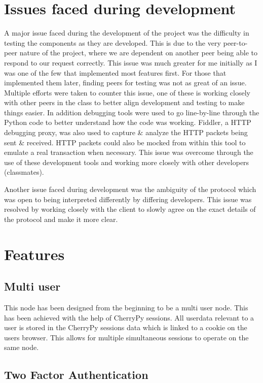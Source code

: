 \documentclass[a4paper,10pt,twoside]{article}
\begin{document}
\section{Issues faced during development}

A major issue faced during the development of the project was the difficulty in testing the components as they are developed. This is due to the very peer-to-peer nature of the project, where we are dependent on another peer being able to respond to our request correctly. This issue was much greater for me initially as I was one of the few that implemented most features first. For those that implemented them later, finding peers for testing was not as great of an issue. Multiple efforts were taken to counter this issue, one of these is working closely with other peers in the class to better align development and testing to make things easier. In addition debugging tools were used to go line-by-line through the Python code to better understand how the code was working. Fiddler, a HTTP debugging proxy, was also used to capture \& analyze the HTTP packets being sent \& received. HTTP packets could also be mocked from within this tool to emulate a real transaction when necessary. This issue was overcome through the use of these development tools and working more closely with other developers (classmates).

Another issue faced during development was the ambiguity of the protocol which was open to being interpreted differently by differing developers. This issue was resolved by working closely with the client to slowly agree on the exact details of the protocol and make it more clear. 

\section{Features}

\subsection{Multi user}

This node has been designed from the beginning to be a multi user node. This has been achieved with the help of CherryPy sessions. All userdata relevant to a user is stored in the CherryPy sessions data which is linked to a cookie on the users browser. This allows for multiple simultaneous sessions to operate on the same node.

\subsection{Two Factor Authentication}
\end{document}
